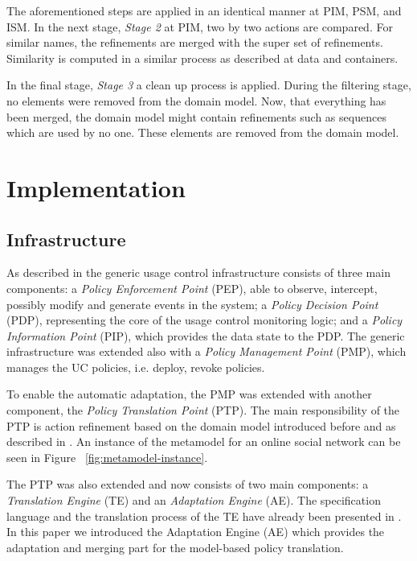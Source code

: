 \documentclass{sig-alternate}
\begin{document}
The aforementioned steps are applied in an identical manner at PIM, PSM, and ISM.
In the next stage, \textit{Stage 2} at PIM, two by two actions are compared.
For similar names, the refinements are merged with the super set of refinements.
Similarity is computed in a similar process as described at data and containers.

In the final stage, \textit{Stage 3} a clean up process is applied.
During the filtering stage, no elements were removed from the domain model.
Now, that everything has been merged, the domain model might contain refinements such as sequences
which are used by no one. These elements are removed from the domain model.

\section{Implementation}



\subsection{Infrastructure}
As described in \cite{workshop1} the generic usage control infrastructure consists of three main components:
a \textit{Policy Enforcement Point} (PEP), able to observe, intercept, possibly modify and generate events in the system;
a \textit{Policy Decision Point} (PDP), representing the core of the usage control monitoring logic;
and a \textit{Policy Information Point} (PIP), which provides the data state to the PDP.
The generic infrastructure was extended also with a \textit{Policy Management Point} (PMP), which manages the UC policies, i.e. deploy, revoke policies.

To enable the automatic adaptation, the PMP was extended with another component, the \textit{Policy Translation Point} (PTP). 
The main responsibility of the PTP is action refinement based on the domain model introduced before and as described in \cite{proceeding4}. 
An instance of the metamodel for an online social network can be seen in Figure ~\ref{fig:metamodel-instance}.

The PTP was also extended and now consists of two main components:
a \textit{Translation Engine} (TE) and an \textit {Adaptation Engine} (AE). 
The specification language and the translation process of the TE have already been presented in \cite{proceeding2,  workshop1, proceeding4}.
In this paper we introduced the Adaptation Engine (AE) which provides the adaptation and merging part for the model-based policy translation.
\end{document}
